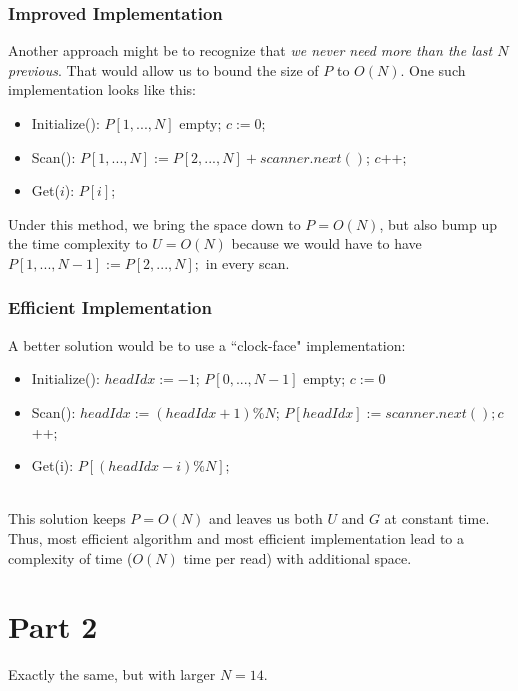 \documentclass[12pt]{article}
\begin{document}
\subsubsection{ Improved Implementation} 
Another approach might be to recognize that \textit{we never need more than the last $N$ previous}. That would allow us to bound the size of $P$ to $O(N)$. One such implementation looks like this:
\begin{itemize}
    \item Initialize(): $P[1, ..., N]$ empty; $c := 0$;
    \item Scan(): $P[1, ..., N] := P[2, ..., N] + scanner.next()$; $c$++;
    \item Get($i$): $P[i]$;
\end{itemize}
Under this method, we bring the space down to $P=O(N)$, but also bump up the time complexity to $U = O(N)$ because we would have to have $P[1, ..., N-1] := P[2, ..., N];$ in every scan.

\subsubsection{ Efficient Implementation} 
\noindent A better solution would be to use a ``clock-face" implementation:
\begin{itemize}
    \item Initialize(): $headIdx := -1$; $P[0, ..., N-1]$ empty; $c := 0$
    \item Scan(): $headIdx := (headIdx + 1) \% N$; $P[headIdx] := scanner.next(); c$++; 
    \item Get(i): $P[(headIdx - i) \% N]$;
\end{itemize}
\\
This solution keeps $P = O(N)$ and leaves us both $U$ and $G$ at constant time.\\

\noindent Thus, most efficient algorithm and most efficient implementation lead to a complexity of  time ($O(N)$ time per read) with  additional space.
\section{Part 2}
Exactly the same, but with larger $N = 14$.
\end{document}
